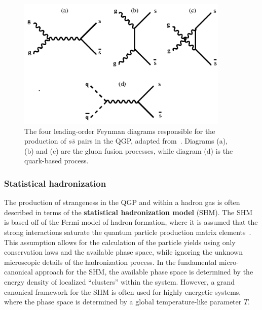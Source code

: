 \begin{figure}[ht]
    \centering
    \includegraphics[width=0.9\textwidth]{figures/introduction/ssbar_production.png}
    \caption{The four leading-order Feynman diagrams responsible for the production of $s\bar{s}$ pairs in the QGP, adapted from~\cite{Strangeness}. Diagrams (a), (b) and (c) are the gluon fusion processes, while diagram (d) is the quark-based process.}
    \label{fig:ssbar_production}
\end{figure}


\subsubsection{Statistical hadronization}
\label{sec:shm}

The production of strangeness in the QGP and within a hadron gas is often described in terms of the \textbf{statistical hadronization model} (SHM). The SHM is based off of the Fermi model of hadron formation, where it is assumed that the strong interactions saturate the quantum particle production matrix elements~\cite{RafelskiStatisticalH}. This assumption allows for the calculation of the particle yields using only conservation laws and the available phase space, while ignoring the unknown microscopic details of the hadronization process. In the fundamental micro-canonical approach for the SHM, the available phase space is determined by the energy density of localized ``clusters'' within the system. However, a grand canonical framework for the SHM is often used for highly energetic systems, where the phase space is determined by a global temperature-like parameter $T$. 

